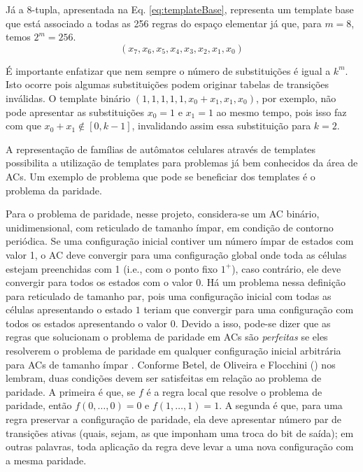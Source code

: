 Já a $8$-tupla, apresentada na Eq. \eqref{eq:templateBase}, representa um template base que está associado a todas as 256 regras do espaço elementar já que, para $m = 8$, temos $2^m = 256 $.
\begin{equation}
(x_7,x_6,x_5,x_4,x_3,x_2,x_1,x_0)
\label{eq:templateBase}
\end{equation}

É importante enfatizar que nem sempre o número de substituições é igual a $k^m$. Isto ocorre pois algumas substituições podem originar tabelas de transições inválidas. O template binário $(1,1,1,1,1,x_0+x_1,x_1,x_0)$, por exemplo, não pode apresentar as substituições $x_0=1$ e $x_1=1$ ao mesmo tempo, pois isso faz com que $x_0 + x_1 \notin [0, k-1]$, invalidando assim essa substituição para $k=2$.

A representação de famílias de autômatos celulares através de templates possibilita a utilização de templates para problemas já bem conhecidos da área de ACs. Um exemplo de problema que pode se beneficiar dos templates é o problema da paridade.

Para o problema de paridade, nesse projeto, considera-se um AC binário, unidimensional, com reticulado de tamanho ímpar, em condição de contorno periódica. Se uma configuração inicial contiver um número ímpar de estados com valor 1, o AC deve convergir para uma configuração global onde toda as células estejam preenchidas com 1 (i.e., com o ponto fixo $1^+$), caso contrário, ele deve convergir para todos os estados com o valor 0. Há um problema nessa definição para  reticulado de tamanho par, pois uma configuração inicial com todas as células apresentando o estado $1$ teriam que convergir para uma configuração com todos os estados apresentando o valor $0$. Devido a isso, pode-se dizer que as regras que solucionam o problema de paridade em ACs são \textit{perfeitas} se eles resolverem o problema de paridade em qualquer configuração inicial arbitrária para ACs de tamanho ímpar \cite{Betel2013}. Conforme Betel, de Oliveira e Flocchini (\citeyear{Betel2013}) nos lembram, duas condições devem ser satisfeitas em relação ao problema de paridade. A primeira é que, se $f$ é a regra local que resolve o problema de paridade, então $f(0, \dots, 0) = 0$ e $f(1, \dots, 1) = 1$. A segunda é que, para uma regra preservar a configuração de paridade, ela deve apresentar número par de transições ativas (quais, sejam, as que imponham uma troca do bit de saída); em outras palavras, toda aplicação da regra deve levar a uma nova configuração com a mesma paridade.

